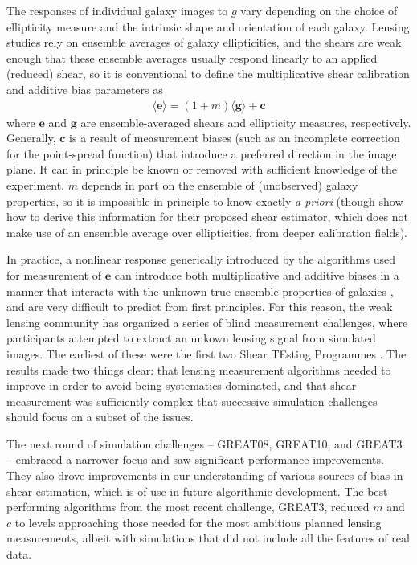 \documentclass[iop]{emulateapj}
\begin{document}
The responses of individual galaxy images to $g$ vary depending on the
choice of ellipticity measure and the intrinsic shape and orientation
of each galaxy. Lensing studies rely on ensemble averages of galaxy
ellipticities, and the shears are weak enough that these ensemble
averages usually respond linearly to an applied (reduced) shear, so it
is conventional to define the multiplicative shear calibration and
additive bias parameters as
\begin{align}
\langle \mathbf{e}\rangle = (1 + m)\langle \mathbf{g}\rangle + \mathbf{c}
\label{eqn:calibPars}
\end{align}
where $\mathbf{e}$ and $\mathbf{g}$ are ensemble-averaged shears and
ellipticity measures, respectively. Generally, $\mathbf{c}$ is a
result of measurement biases (such as an incomplete correction for the
point-spread function) that introduce a preferred direction in the
image plane. It can in principle be known or removed with sufficient
knowledge of the experiment. $m$ depends in part on the ensemble of
(unobserved) galaxy properties, so it is impossible in principle to
know exactly {\it a priori} (though \citealt{2014MNRAS.438.1880B} show
how to derive this information for their proposed shear estimator,
which does not make use of an ensemble average over ellipticities,
from deeper calibration fields).


In practice, a nonlinear response generically introduced by the algorithms
used for measurement of $\boldsymbol{e}$ can introduce both
multiplicative and additive biases in a manner that interacts with the
unknown true ensemble properties of galaxies
\citep{2007MNRAS.380..229M,2011MNRAS.414.1047Z}, and are very
difficult to predict from first principles. For this reason, the weak
lensing community has organized a series of blind measurement
challenges, where participants attempted to extract an unkown lensing
signal from simulated images.  The earliest of these were the first
two Shear TEsting Programmes \citep[STEP1,
STEP2]{2006MNRAS.368.1323H,2007MNRAS.376...13M}. The results made two
things clear: that lensing measurement algorithms needed to improve in order to avoid being
systematics-dominated,
and that shear measurement was sufficiently complex that successive
simulation challenges should focus on a subset of the issues.

The next round of simulation challenges -- GREAT08, GREAT10, and GREAT3
\citep{2009AnApS...3....6B,2013ApJS..205...12K, 2015MNRAS.450.2963M} --
embraced a narrower focus and saw significant performance
improvements. They also drove improvements in our understanding of 
various sources of bias in shear estimation, which is of use in future
algorithmic development.  The best-performing algorithms from the most
recent challenge, GREAT3, reduced $m$ and $c$ to levels approaching
those needed for the most ambitious planned lensing measurements,
albeit with simulations that did not include all the features of real
data.
\end{document}
